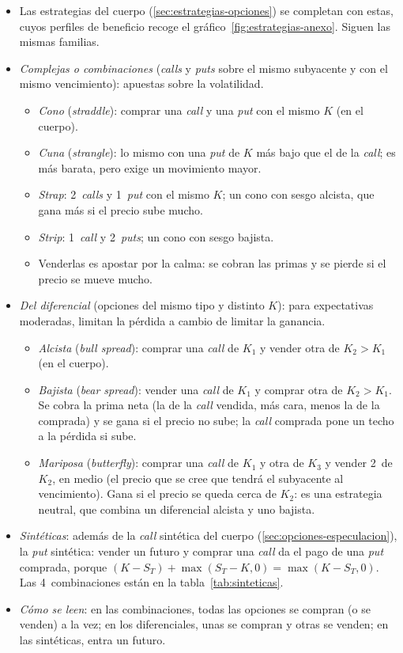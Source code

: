 \documentclass[11pt]{article}
\begin{document}
\begin{itemize}
\item Las estrategias del cuerpo (\ref{sec:estrategias-opciones}) se completan con estas, cuyos perfiles de beneficio recoge el gráfico~\ref{fig:estrategias-anexo}\nocite{Hull2022Options}. Siguen las mismas familias.
\item \emph{Complejas o combinaciones} (\emph{calls} y \emph{puts} sobre el mismo subyacente y con el mismo vencimiento): apuestas sobre la volatilidad.
  \begin{itemize}
  \item \emph{Cono} (\emph{straddle}): comprar una \emph{call} y una \emph{put} con el mismo $K$ (en el cuerpo).
  \item \emph{Cuna} (\emph{strangle}): lo mismo con una \emph{put} de $K$ más bajo que el de la \emph{call}; es más barata, pero exige un movimiento mayor.
  \item \emph{Strap}: 2~\emph{calls} y 1~\emph{put} con el mismo $K$; un cono con sesgo alcista, que gana más si el precio sube mucho.
  \item \emph{Strip}: 1~\emph{call} y 2~\emph{puts}; un cono con sesgo bajista.
  \item Venderlas es apostar por la calma: se cobran las primas y se pierde si el precio se mueve mucho.
  \end{itemize}
\item \emph{Del diferencial} (opciones del mismo tipo y distinto $K$): para expectativas moderadas, limitan la pérdida a cambio de limitar la ganancia.
  \begin{itemize}
  \item \emph{Alcista} (\emph{bull spread}): comprar una \emph{call} de $K_1$ y vender otra de $K_2>K_1$ (en el cuerpo).
  \item \emph{Bajista} (\emph{bear spread}): vender una \emph{call} de $K_1$ y comprar otra de $K_2>K_1$. Se cobra la prima neta (la de la \emph{call} vendida, más cara, menos la de la comprada) y se gana si el precio no sube; la \emph{call} comprada pone un techo a la pérdida si sube.
  \item \emph{Mariposa} (\emph{butterfly}): comprar una \emph{call} de $K_1$ y otra de $K_3$ y vender 2~de $K_2$, en medio (el precio que se cree que tendrá el subyacente al vencimiento). Gana si el precio se queda cerca de $K_2$: es una estrategia neutral, que combina un diferencial alcista y uno bajista.
  \end{itemize}
\item \emph{Sintéticas}: además de la \emph{call} sintética del cuerpo (\ref{sec:opciones-especulacion}), la \emph{put} sintética: vender un futuro y comprar una \emph{call} da el pago de una \emph{put} comprada, porque $(K-S_T)+\max(S_T-K,0)=\max(K-S_T,0)$. Las 4~combinaciones están en la tabla~\ref{tab:sinteticas}.
\item \emph{Cómo se leen}: en las combinaciones, todas las opciones se compran (o se venden) a la vez; en los diferenciales, unas se compran y otras se venden; en las sintéticas, entra un futuro.
\end{itemize}
\end{document}
